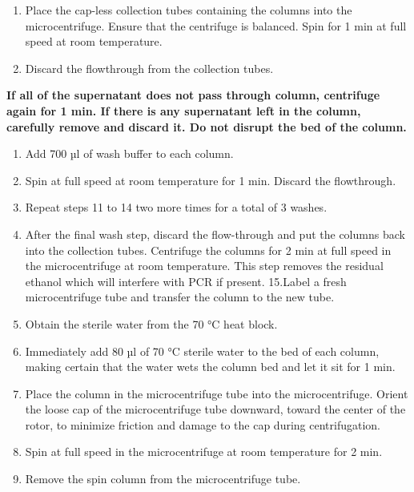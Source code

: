 \documentclass[]{book}
\providecommand{\tightlist}{%
  \setlength{\itemsep}{0pt}\setlength{\parskip}{0pt}}
\theoremstyle{definition}
\theoremstyle{definition}
\theoremstyle{definition}
\theoremstyle{remark}
\let\BeginKnitrBlock\begin \let\EndKnitrBlock\end
\begin{document}
\begin{enumerate}
\def\labelenumi{\arabic{enumi}.}
\setcounter{enumi}{11}
\tightlist
\item
  Place the cap-less collection tubes containing the columns into the
  microcentrifuge. Ensure that the centrifuge is balanced. Spin for 1
  min at full speed at room temperature.
\item
  Discard the flowthrough from the collection tubes.
\end{enumerate}

\BeginKnitrBlock{rmdimportant}
\textbf{If all of the supernatant does not pass through column,
centrifuge again for 1 min. If there is any supernatant left in the
column, carefully remove and discard it. Do not disrupt the bed of the
column.}
\EndKnitrBlock{rmdimportant}

\begin{enumerate}
\def\labelenumi{\arabic{enumi}.}
\setcounter{enumi}{12}
\tightlist
\item
  Add 700 µl of wash buffer to each column.
\item
  Spin at full speed at room temperature for 1 min. Discard the
  flowthrough.
\item
  Repeat steps 11 to 14 two more times for a total of 3 washes.
\item
  After the final wash step, discard the flow-through and put the
  columns back into the collection tubes. Centrifuge the columns for 2
  min at full speed in the microcentrifuge at room temperature. This
  step removes the residual ethanol which will interfere with PCR if
  present. 15.Label a fresh microcentrifuge tube and transfer the column
  to the new tube.
\item
  Obtain the sterile water from the 70 °C heat block.
\item
  Immediately add 80 µl of 70 °C sterile water to the bed of each
  column, making certain that the water wets the column bed and let it
  sit for 1 min.
\item
  Place the column in the microcentrifuge tube into the microcentrifuge.
  Orient the loose cap of the microcentrifuge tube downward, toward the
  center of the rotor, to minimize friction and damage to the cap during
  centrifugation.
\item
  Spin at full speed in the microcentrifuge at room temperature for 2
  min.
\item
  Remove the spin column from the microcentrifuge tube.
\end{enumerate}
\end{document}
